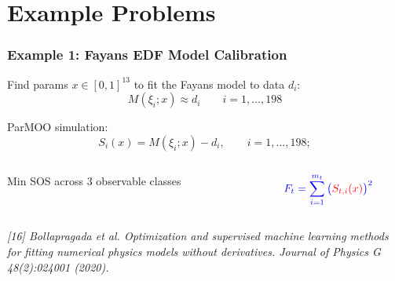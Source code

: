 \documentclass[aspectratio=169]{beamer}
\begin{document}
\section{Example Problems}

\begin{frame}\frametitle{Example 1: Fayans EDF Model Calibration}
Find params $x \in [0, 1]^{13}$ to fit the Fayans model to data $d_i$:
$$
M\left(\xi_{i};x\right) \approx d_{i} \qquad i=1,\ldots, 198
$$

\medskip

ParMOO simulation:
$$
S_{i}(x) = M\left(\xi_{i};x\right) - d_{i},
\qquad i=1,\ldots, 198;
$$

\medskip

\begin{columns}
\begin{column}{0.65\textwidth}
Min SOS across 3 observable classes
\end{column}
\begin{column}{0.35\textwidth}
$$
{\color{blue}F_t = \sum_{i=1}^{m_t}\big({\color{red}S_{t,i}(x)}\big)^2}
$$
\end{column}
\end{columns}

\vfill

{\tiny\it
[16] Bollapragada et al.
Optimization and supervised machine learning methods for fitting numerical physics models without derivatives.
Journal of Physics G 48(2):024001 (2020).\\}
\end{frame}
\end{document}
